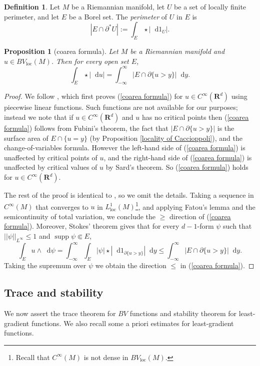 \documentclass[reqno,12pt,letterpaper]{amsart}
\newcommand{\RR}{\mathbf{R}}
\DeclareMathOperator{\supp}{supp}
\newcommand*\dif{\mathop{}\!\mathrm{d}}
\newcommand{\dfn}[1]{\emph{#1}\index{#1}}
\newcommand{\loc}{\mathrm{loc}}
\newtheorem{proposition}[theorem]{Proposition}
\theoremstyle{definition}
\newtheorem{definition}[theorem]{Definition}
\numberwithin{equation}{section}
\begin{document}
\begin{definition}
Let $M$ be a Riemannian manifold, let $U$ be a set of locally finite perimeter, and let $E$ be a Borel set.
The \dfn{perimeter} of $U$ in $E$ is
$$|E \cap \partial^* U| := \int_E \star |\dif 1_U|.$$
\end{definition}

\begin{proposition}[coarea formula]\label{Coarea2}
Let $M$ be a Riemannian manifold and $u \in BV_\loc(M)$. Then for every open set $E$,
\begin{equation}\label{coarea formula}
\int_E \star |\dif u| = \int_{-\infty}^\infty |E \cap \partial \{u > y\}| \dif y.
\end{equation}
\end{proposition}
\begin{proof}
We follow \cite[Theorem 1.23]{Giusti77}, which first proves (\ref{coarea formula}) for $u \in C^\infty(\RR^d)$ using piecewise linear functions.
Such functions are not available for our purposes; instead we note that if $u \in C^\infty(\RR^d)$ and $u$ has no critical points then (\ref{coarea formula}) follows from Fubini's theorem, the fact that $|E \cap \partial \{u > y\}|$ is the surface area of $E \cap \{u = y\}$ (by Proposition \ref{locality of Caccioppoli}), and the change-of-variables formula.
However the left-hand side of (\ref{coarea formula}) is unaffected by critical points of $u$, and the right-hand side of (\ref{coarea formula}) is unaffected by critical values of $u$ by Sard's theorem.
So (\ref{coarea formula}) holds for $u \in C^\infty(\RR^d)$.

The rest of the proof is identical to \cite[Theorem 1.23]{Giusti77}, so we omit the details.
Taking a sequence in $C^\infty(M)$ that converges to $u$ in $L^1_\loc(M)$\footnote{Recall that $C^\infty(M)$ is not dense in $BV_\loc(M)$.}, and applying Fatou's lemma and the semicontinuity of total variation, we conclude the $\geq$ direction of (\ref{coarea formula}).
Moreover, Stokes' theorem gives that for every $d-1$-form $\psi$ such that $||\psi||_{L^\infty} \leq 1$ and $\supp \psi \Subset E$,
$$\int_E u \wedge \dif \psi = \int_{-\infty}^\infty \int_E |\psi| \star |\dif 1_{\partial \{u > y\}}| \dif y \leq \int_{-\infty}^\infty |E \cap \partial \{u > y\}| \dif y.$$
Taking the supremum over $\psi$ we obtain the direction $\leq$ in (\ref{coarea formula}).
\end{proof}


\subsection{Trace and stability}
We now assert the trace theorem for $BV$ functions and stability theorem for least-gradient functions.
We also recall some a priori estimates for least-gradient functions.
\end{document}
